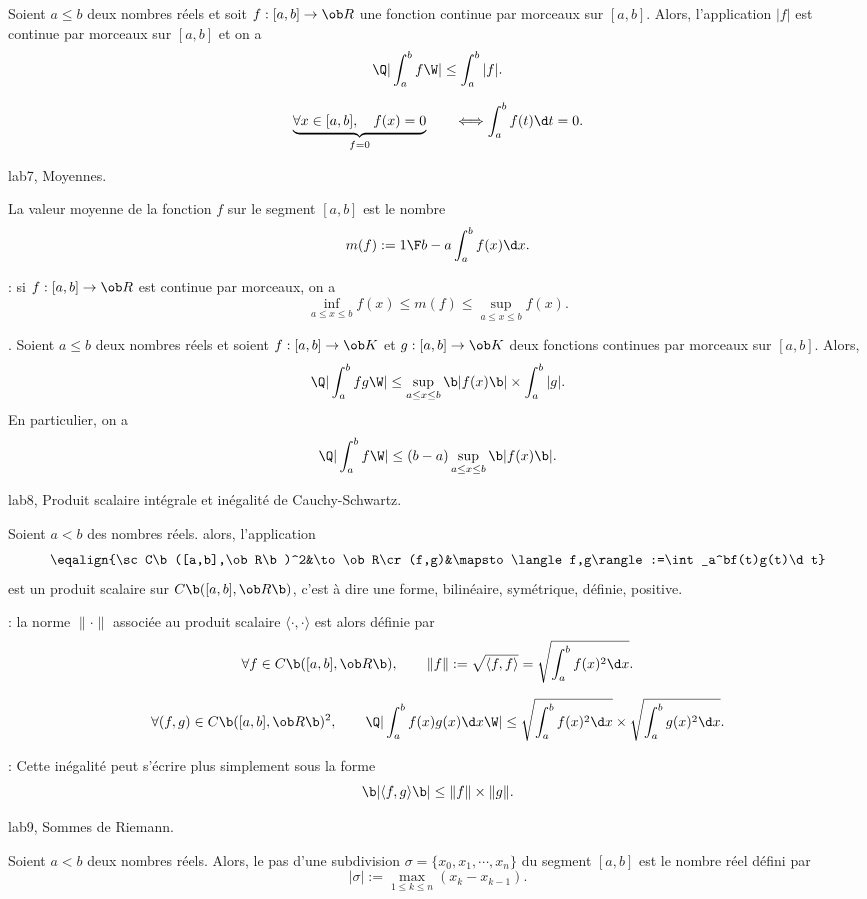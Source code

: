 \Propriete [Title=module]
Soient $a\le b$ deux nombres réels et soit $f:[a,b]\to\ob R$ une fonction 
continue par morceaux sur $[a,b]$. Alors, l'application $|f|$ est continue par morceaux sur $[a,b]$ et on a 
$$
\Q|\int_a^bf\W|\le \int_a^b|f|.
$$ 
\bigskip

$$
\underbrace{\forall x\in[a,b],\quad f(x)=0}_{f=0}\qquad\Longleftrightarrow \int_a^bf(t)\d t=0.
$$

\Subsection lab7, Moyennes. 
\bigskip

La valeur moyenne de la fonction $f$ sur le segment $[a,b]$ est le nombre
$$
m(f):={1\F b-a}\int_a^bf(x)\d x.
$$

\Remarque : si $f:[a,b]\to\ob R$ est continue par morceaux, on a 
$$
\inf_{a\le x\le b}f(x)\le m(f)\le \sup_{a\le x\le b}f(x).
$$

. Soient $a\le b$ deux nombres réels et soient $f:[a,b]\to\ob K$ et $g:[a,b]\to\ob K$ deux fonctions continues par morceaux sur $[a,b]$. Alors, 
$$
\Q|\int_a^bfg\W|\le \sup_{a\le x\le b}\b|f(x)\b|\times\int_a^b|g|.
$$
En particulier, on a 
$$
\Q|\int_a^bf\W|\le (b-a)\sup_{a\le x\le b}\b|f(x)\b|.
$$


\Subsection lab8, Produit scalaire intégrale et inégalité de Cauchy-Schwartz.
\bigskip

\Propriete []  Soient $a< b$ des nombres réels. alors, l'application 
$$
\eqalign{\sc C\b([a,b],\ob R\b)^2&\to\ob R\cr(f,g)&\mapsto\langle f,g\rangle:=\int_a^bf(t)g(t)\d t}
$$
est un produit scalaire sur $\sc C\b([a,b],\ob R\b)$, c'est à dire une forme, bilinéaire, symétrique, définie, positive. 
\bigskip

\Remarque : la norme $\|\cdot\|$ associée au produit scalaire $\langle\cdot,\cdot\rangle$ est alors définie par 
$$
\forall f\in\sc C\b([a,b],\ob R\b), \qquad \|f\|:=\sqrt{\langle f,f\rangle}=\sqrt{\int_a^bf(x)^2\d x}.
$$

\Theoreme [Title=Inégalité de Cauchy-Schwarz; $a<b$] 
$$
\forall (f,g)\in\sc C\b([a,b],\ob R\b)^2, \qquad \Q|\int_a^bf(x)g(x)\d x\W|\le \sqrt{\int_a^bf(x)^2\d x}
\times\sqrt{\int_a^bg(x)^2\d x}.
$$

\Remarque : Cette inégalité peut s'écrire plus simplement sous la forme 
$$
\b|\langle f,g\rangle\b|\le \|f\|\times\|g\|.
$$

\Subsection lab9, Sommes de Riemann.

\Definition []  Soient $a<b$ deux nombres réels. Alors, le pas d'une subdivision $\sigma=\{x_0,x_1,\cdots,x_n\}$ du segment $[a,b]$ est le nombre réel défini par
$$
|\sigma|:=\max_{1\le k\le n}(x_k-x_{k-1}).
$$

